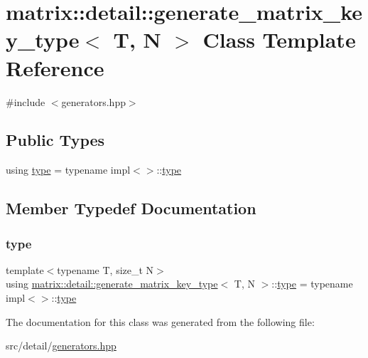\hypertarget{classmatrix_1_1detail_1_1generate__matrix__key__type}{}\section{matrix\+:\+:detail\+:\+:generate\+\_\+matrix\+\_\+key\+\_\+type$<$ T, N $>$ Class Template Reference}
\label{classmatrix_1_1detail_1_1generate__matrix__key__type}


{\ttfamily \#include $<$generators.\+hpp$>$}

\subsection*{Public Types}
\begin{DoxyCompactItemize}
\item 
using \hyperlink{classmatrix_1_1detail_1_1generate__matrix__key__type_a88ef0266204cb6963f993fd009610732}{type} = typename impl$<$$>$\+::\hyperlink{classmatrix_1_1detail_1_1generate__matrix__key__type_a88ef0266204cb6963f993fd009610732}{type}
\end{DoxyCompactItemize}


\subsection{Member Typedef Documentation}
\mbox{\label{classmatrix_1_1detail_1_1generate__matrix__key__type_a88ef0266204cb6963f993fd009610732}} 
\subsubsection{\texorpdfstring{type}{type}}
{\footnotesize\ttfamily template$<$typename T, size\+\_\+t N$>$ \\
using \hyperlink{classmatrix_1_1detail_1_1generate__matrix__key__type}{matrix\+::detail\+::generate\+\_\+matrix\+\_\+key\+\_\+type}$<$ T, N $>$\+::\hyperlink{classmatrix_1_1detail_1_1generate__matrix__key__type_a88ef0266204cb6963f993fd009610732}{type} =  typename impl$<$$>$\+::\hyperlink{classmatrix_1_1detail_1_1generate__matrix__key__type_a88ef0266204cb6963f993fd009610732}{type}}



The documentation for this class was generated from the following file\+:\begin{DoxyCompactItemize}
\item 
src/detail/\hyperlink{generators_8hpp}{generators.\+hpp}\end{DoxyCompactItemize}
